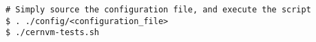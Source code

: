 \begin{enumerate}
\lstset{language=bash,caption=Execute CernVM Test Cases Script}
\begin{lstlisting}
# Simply source the configuration file, and execute the script
$ . ./config/<configuration_file>
$ ./cernvm-tests.sh
\end{lstlisting}
\end{enumerate}
